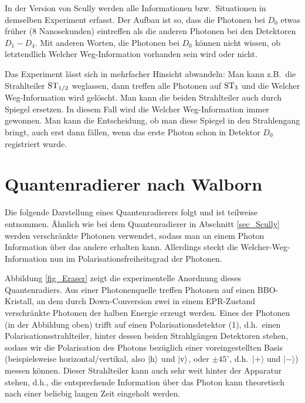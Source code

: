 In der Version von Scully werden alle Informationen bzw.\ Situationen in demselben Experiment
erfasst. Der Aufbau ist so, dass die Photonen bei $D_0$ etwas fr\"uher (8 Nanosekunden)
eintreffen als die anderen Photonen bei den Detektoren $D_1-D_4$. Mit anderen Worten, die
Photonen bei $D_0$ k\"onnen nicht wissen, ob letztendlich \glqq Welcher Weg\grqq-Information
vorhanden sein wird oder nicht. 

Das Experiment l\"asst sich in mehrfacher Hinsicht abwandeln: Man kann z.B.\ die Strahlteiler
${\rm ST}_{1/2}$ weglassen, dann treffen alle Photonen auf ${\rm ST}_3$ und die 
\glqq Welcher Weg\grqq-Information wird gel\"oscht. Man kann die beiden Strahlteiler auch durch
Spiegel ersetzen. In diesem Fall wird die \glqq Welcher Weg\grqq-Information immer gewonnen.
Man kann die Entscheidung, ob man diese Spiegel in den Strahlengang bringt, auch erst dann
f\"allen, wenn das erste Photon schon in Detektor $D_0$ registriert wurde. 

\section{Quantenradierer nach Walborn}
\label{sec_Walborn}

Die folgende Darstellung eines Quantenradierers folgt \cite{Walborn} und ist
teilweise \cite{Filk} entnommen. \"Ahnlich wie bei dem Quantenradierer in Abschnitt
\ref{sec_Scully} werden verschr\"ankte Photonen verwendet, sodass man an einem Photon
Information \"uber das andere erhalten kann. Allerdings steckt die \glqq Welcher-Weg\grqq-Information
nun im Polarisationsfreiheitsgrad der Photonen.  

 Abbildung \ref{fig_Eraser} zeigt die experimentelle Anordnung dieses Quantenradiers. 
 Aus einer Photonenquelle treffen Photonen auf einen
 BBO-Kristall, an dem durch
 Down-Conversion zwei in einem EPR-Zustand verschr\"ankte Photonen der halben Energie
 erzeugt werden. Eines der Photonen (in der Abbildung oben)
 trifft auf einen Polarisationsdetektor (1), d.h.\ einen Polarisationsstrahlteiler,
 hinter dessen beiden Strahlg\"angen Detektoren stehen, sodass wir
 die Polarisation des Photons bez\"uglich einer voreingestellten
 Basis (beispielsweise horizontal/vertikal, also $|{\rm h}\rangle$ und
 $|{\rm v}\rangle$, oder $\pm 45^\circ$, d.h.\ $|+\rangle$ und $|-\rangle$)
 messen k\"onnen. Dieser Strahlteiler kann auch sehr weit hinter
 der Apparatur stehen, d.h., die entsprechende Information \"uber
 das Photon kann theoretisch nach einer beliebig langen Zeit eingeholt werden.


